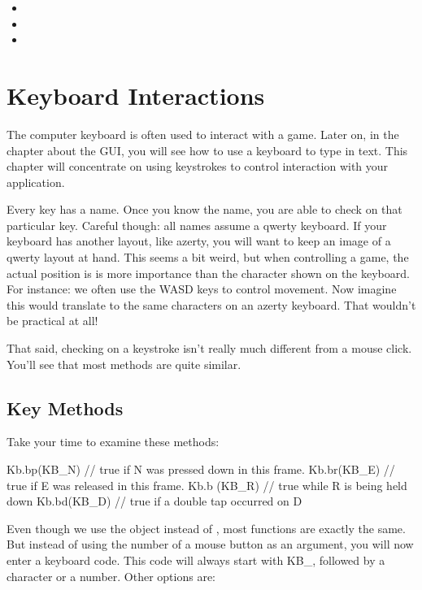 \begin{itemize}
	\item {}
	\item {}
	\item {}
\end{itemize}

\section{Keyboard Interactions}
The computer keyboard is often used to interact with a game. Later on, in the chapter about the GUI, you will see how to use a keyboard to type in text. This chapter will concentrate on using keystrokes to control interaction with your application.

Every key has a name. Once you know the name, you are able to check on that particular key. Careful though: all names assume a qwerty keyboard. If your keyboard has another layout, like azerty, you will want to keep an image of a qwerty layout at hand. This seems a bit weird, but when controlling a game, the actual position is is more importance than the character shown on the keyboard. For instance: we often use the WASD keys to control movement. Now imagine this would translate to the same characters on an azerty keyboard. That wouldn't be practical at all!

That said, checking on a keystroke isn't really much different from a mouse click. You'll see that most methods are quite similar.

\subsection{Key Methods}

Take your time to examine these methods:

\begin{code}
Kb.bp(KB_N) // true if N was pressed down in this frame.
Kb.br(KB_E) // true if E was released in this frame.
Kb.b (KB_R) // true while R is being held down
Kb.bd(KB_D) // true if a double tap occurred on D
\end{code}

Even though we use the object  instead of , most functions are exactly the same.  But instead of using the number of a mouse button as an argument, you will now enter a keyboard code. This code will always start with KB\_, followed by a character or a number. Other options are:

